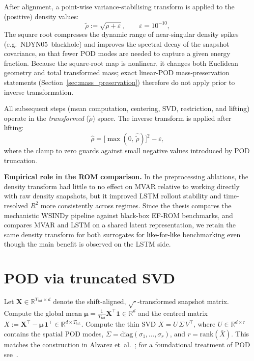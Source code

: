After alignment, a point-wise variance-stabilising transform is applied to
the (positive) density values:
\begin{equation}
  \tilde{\rho} := \sqrt{\rho + \varepsilon},
  \qquad \varepsilon = 10^{-10},
  \label{eq:sqrt_transform}
\end{equation}
The square
root compresses the dynamic range of near-singular density spikes (e.g.\
NDYN05~blackhole) and improves the spectral decay of the snapshot
covariance, so that fewer POD modes are needed to capture a given energy
fraction.  Because the square-root map is nonlinear, it changes both
Euclidean geometry and total transformed mass; exact linear-POD
mass-preservation statements (Section~\ref{sec:mass_preservation})
therefore do not apply prior to inverse transformation.

All subsequent steps (mean computation, centering, SVD, restriction, and
lifting) operate in the \emph{transformed} ($\tilde\rho$) space.  The
inverse transform is applied after lifting:
\begin{equation}
  \hat{\rho} = \bigl[\max(0,\,\hat{\tilde\rho})\bigr]^2 - \varepsilon,
  \label{eq:sqrt_inverse}
\end{equation}
where the clamp to zero guards against small negative values introduced by
POD truncation.

\noindent\textbf{Empirical role in the ROM comparison.}
In the preprocessing ablations, the density transform had little to no
effect on MVAR relative to working directly with raw density snapshots, but
it improved LSTM rollout stability and time-resolved $R^2$ more
consistently across regimes.  Since the thesis compares the mechanistic
WSINDy pipeline against black-box EF-ROM benchmarks, and compares MVAR and
LSTM on a shared latent representation, we retain the same density
transform for both surrogates for like-for-like benchmarking even though
the main benefit is observed on the LSTM side.

\section{POD via truncated SVD}
\label{sec:pod_svd}

Let $\mathbf{X}\in\mathbb{R}^{T_{\mathrm{tot}}\times d}$ denote the
shift-aligned, $\sqrt{\cdot}$-transformed snapshot matrix.  Compute the
global mean $\boldsymbol{\mu}=\tfrac{1}{T_{\mathrm{tot}}}
\mathbf{X}^\top\mathbf{1}\in\mathbb{R}^d$ and the centred matrix
$\bar{X} := \mathbf{X}^\top - \boldsymbol{\mu}\,\mathbf{1}^\top
\in\mathbb{R}^{d\times T_{\mathrm{tot}}}$.
Compute the thin SVD
$\bar{X} = U\,\Sigma\,V^\top$,
where $U\in\mathbb{R}^{d\times r}$ contains the spatial POD modes,
$\Sigma=\mathrm{diag}(\sigma_1,\dots,\sigma_r)$, and $r=\mathrm{rank}(\bar{X})$.
This matches the construction in Alvarez et~al.~\cite{alvarez2025eqfree};
for a foundational treatment of POD see~\cite{berkooz1993pod}.

